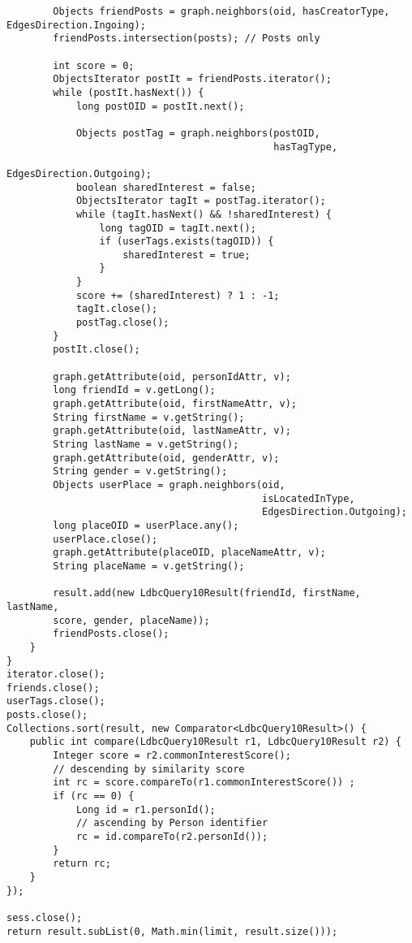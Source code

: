 {\begin{verbatim}
        Objects friendPosts = graph.neighbors(oid, hasCreatorType, EdgesDirection.Ingoing);
        friendPosts.intersection(posts); // Posts only

        int score = 0;
        ObjectsIterator postIt = friendPosts.iterator();
        while (postIt.hasNext()) {
            long postOID = postIt.next();

            Objects postTag = graph.neighbors(postOID, 
                                              hasTagType, 
                                              EdgesDirection.Outgoing);
            boolean sharedInterest = false;
            ObjectsIterator tagIt = postTag.iterator();
            while (tagIt.hasNext() && !sharedInterest) {
                long tagOID = tagIt.next();
                if (userTags.exists(tagOID)) {
                    sharedInterest = true;
                }
            }
            score += (sharedInterest) ? 1 : -1;
            tagIt.close();
            postTag.close();
        }
        postIt.close();

        graph.getAttribute(oid, personIdAttr, v);
        long friendId = v.getLong();
        graph.getAttribute(oid, firstNameAttr, v);
        String firstName = v.getString();
        graph.getAttribute(oid, lastNameAttr, v);
        String lastName = v.getString();
        graph.getAttribute(oid, genderAttr, v);
        String gender = v.getString();
        Objects userPlace = graph.neighbors(oid, 
                                            isLocatedInType, 
                                            EdgesDirection.Outgoing);
        long placeOID = userPlace.any();
        userPlace.close();
        graph.getAttribute(placeOID, placeNameAttr, v);
        String placeName = v.getString();
        
        result.add(new LdbcQuery10Result(friendId, firstName, lastName,
        score, gender, placeName));
        friendPosts.close();
    }
}
iterator.close();
friends.close();
userTags.close();
posts.close();
Collections.sort(result, new Comparator<LdbcQuery10Result>() {
    public int compare(LdbcQuery10Result r1, LdbcQuery10Result r2) {
        Integer score = r2.commonInterestScore();
        // descending by similarity score
        int rc = score.compareTo(r1.commonInterestScore()) ; 
        if (rc == 0) {
            Long id = r1.personId();
            // ascending by Person identifier
            rc = id.compareTo(r2.personId()); 
        }
        return rc;
    }
});

sess.close();
return result.subList(0, Math.min(limit, result.size()));

\end{verbatim}
}

